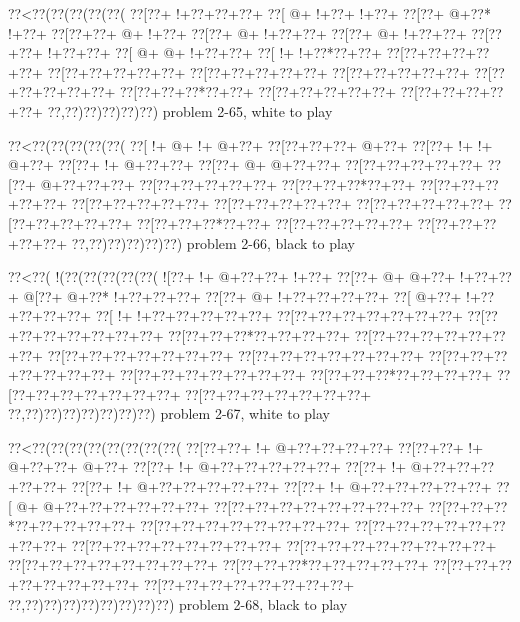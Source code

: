 \vbox{\vbox{\goo
\0??<\0??(\0??(\0??(\0??(\0??(
\0??[\0??+\- !+\0??+\0??+\0??+
\0??[\- @+\- !+\0??+\- !+\0??+
\0??[\0??+\- @+\0??*\- !+\0??+
\0??[\0??+\0??+\- @+\- !+\0??+
\0??[\0??+\- @+\- !+\0??+\0??+
\0??[\0??+\- @+\- !+\0??+\0??+
\0??[\0??+\0??+\- !+\0??+\0??+
\0??[\- @+\- @+\- !+\0??+\0??+
\0??[\- !+\- !+\0??*\0??+\0??+
\0??[\0??+\0??+\0??+\0??+\0??+
\0??[\0??+\0??+\0??+\0??+\0??+
\0??[\0??+\0??+\0??+\0??+\0??+
\0??[\0??+\0??+\0??+\0??+\0??+
\0??[\0??+\0??+\0??+\0??+\0??+
\0??[\0??+\0??+\0??*\0??+\0??+
\0??[\0??+\0??+\0??+\0??+\0??+
\0??[\0??+\0??+\0??+\0??+\0??+
\0??,\0??)\0??)\0??)\0??)\0??)
}
\hfil problem 2-65, white to play\hfil\break
}

\vbox{\vbox{\goo
\0??<\0??(\0??(\0??(\0??(\0??(
\0??[\- !+\- @+\- !+\- @+\0??+
\0??[\0??+\0??+\0??+\- @+\0??+
\0??[\0??+\- !+\- !+\- @+\0??+
\0??[\0??+\- !+\- @+\0??+\0??+
\0??[\0??+\- @+\- @+\0??+\0??+
\0??[\0??+\0??+\0??+\0??+\0??+
\0??[\0??+\- @+\0??+\0??+\0??+
\0??[\0??+\0??+\0??+\0??+\0??+
\0??[\0??+\0??+\0??*\0??+\0??+
\0??[\0??+\0??+\0??+\0??+\0??+
\0??[\0??+\0??+\0??+\0??+\0??+
\0??[\0??+\0??+\0??+\0??+\0??+
\0??[\0??+\0??+\0??+\0??+\0??+
\0??[\0??+\0??+\0??+\0??+\0??+
\0??[\0??+\0??+\0??*\0??+\0??+
\0??[\0??+\0??+\0??+\0??+\0??+
\0??[\0??+\0??+\0??+\0??+\0??+
\0??,\0??)\0??)\0??)\0??)\0??)
}
\hfil problem 2-66, black to play\hfil\break
}

\vbox{\vbox{\goo
\0??<\0??(\- !(\0??(\0??(\0??(\0??(\0??(
\- ![\0??+\- !+\- @+\0??+\0??+\- !+\0??+
\0??[\0??+\- @+\- @+\0??+\- !+\0??+\0??+
\- @[\0??+\- @+\0??*\- !+\0??+\0??+\0??+
\0??[\0??+\- @+\- !+\0??+\0??+\0??+\0??+
\0??[\- @+\0??+\- !+\0??+\0??+\0??+\0??+
\0??[\- !+\- !+\0??+\0??+\0??+\0??+\0??+
\0??[\0??+\0??+\0??+\0??+\0??+\0??+\0??+
\0??[\0??+\0??+\0??+\0??+\0??+\0??+\0??+
\0??[\0??+\0??+\0??*\0??+\0??+\0??+\0??+
\0??[\0??+\0??+\0??+\0??+\0??+\0??+\0??+
\0??[\0??+\0??+\0??+\0??+\0??+\0??+\0??+
\0??[\0??+\0??+\0??+\0??+\0??+\0??+\0??+
\0??[\0??+\0??+\0??+\0??+\0??+\0??+\0??+
\0??[\0??+\0??+\0??+\0??+\0??+\0??+\0??+
\0??[\0??+\0??+\0??*\0??+\0??+\0??+\0??+
\0??[\0??+\0??+\0??+\0??+\0??+\0??+\0??+
\0??[\0??+\0??+\0??+\0??+\0??+\0??+\0??+
\0??,\0??)\0??)\0??)\0??)\0??)\0??)\0??)
}
\hfil problem 2-67, white to play\hfil\break
}

\vbox{\vbox{\goo
\0??<\0??(\0??(\0??(\0??(\0??(\0??(\0??(\0??(
\0??[\0??+\0??+\- !+\- @+\0??+\0??+\0??+\0??+
\0??[\0??+\0??+\- !+\- @+\0??+\0??+\- @+\0??+
\0??[\0??+\- !+\- @+\0??+\0??+\0??+\0??+\0??+
\0??[\0??+\- !+\- @+\0??+\0??+\0??+\0??+\0??+
\0??[\0??+\- !+\- @+\0??+\0??+\0??+\0??+\0??+
\0??[\0??+\- !+\- @+\0??+\0??+\0??+\0??+\0??+
\0??[\- @+\- @+\0??+\0??+\0??+\0??+\0??+\0??+
\0??[\0??+\0??+\0??+\0??+\0??+\0??+\0??+\0??+
\0??[\0??+\0??+\0??*\0??+\0??+\0??+\0??+\0??+
\0??[\0??+\0??+\0??+\0??+\0??+\0??+\0??+\0??+
\0??[\0??+\0??+\0??+\0??+\0??+\0??+\0??+\0??+
\0??[\0??+\0??+\0??+\0??+\0??+\0??+\0??+\0??+
\0??[\0??+\0??+\0??+\0??+\0??+\0??+\0??+\0??+
\0??[\0??+\0??+\0??+\0??+\0??+\0??+\0??+\0??+
\0??[\0??+\0??+\0??*\0??+\0??+\0??+\0??+\0??+
\0??[\0??+\0??+\0??+\0??+\0??+\0??+\0??+\0??+
\0??[\0??+\0??+\0??+\0??+\0??+\0??+\0??+\0??+
\0??,\0??)\0??)\0??)\0??)\0??)\0??)\0??)\0??)
}
\hfil problem 2-68, black to play\hfil\break
}

